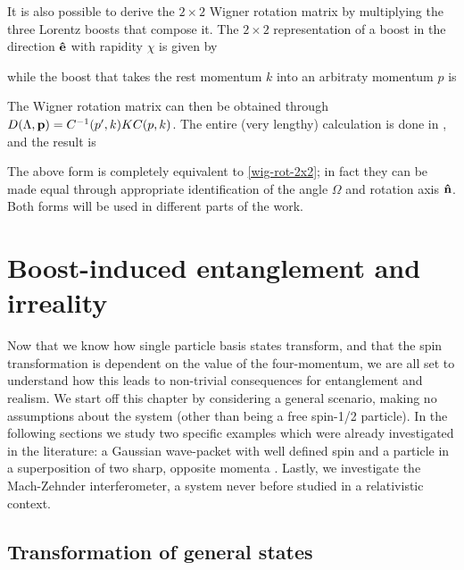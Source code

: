\documentclass[12pt,a4paper,notitlepage]{report}
\begin{document}
It is also possible to derive the $2\times2$ Wigner rotation matrix by multiplying the three Lorentz boosts that compose it. The $2\times2$ representation of a boost in the direction $\vu{e}$ with rapidity $\chi$ is given by

%
while the boost that takes the rest momentum $k$ into an arbitraty momentum $p$ is

%
The Wigner rotation matrix can then be obtained through $D(\Lambda, \vb{p}) = C^{-1}(p',k) K C(p,k)$. The entire (very lengthy) calculation is done in \cite{halpern_1968}, and the result is

%
The above form is completely equivalent to \eqref{wig-rot-2x2}; in fact they can be made equal through appropriate identification of the angle $\Omega$ and rotation axis $\vu{n}$. Both forms will be used in different parts of the work.


\pagebreak

\chapter{Boost-induced entanglement and irreality}

Now that we know how single particle basis states transform, and that the spin transformation is dependent on the value of the four-momentum, we are all set to understand how this leads to non-trivial consequences for entanglement and realism. We start off this chapter by considering a general scenario, making no assumptions about the system (other than being a free spin-1/2 particle). In the following sections we study two specific examples which were already investigated in the literature: a Gaussian wave-packet with well defined spin \cite{peres2002} and a particle in a superposition of two sharp, opposite momenta \cite{dunningham_palge_vedral_2009}. Lastly, we investigate the Mach-Zehnder interferometer, a system never before studied in a relativistic context.

\section{Transformation of general states}
\label{gen-states}
\end{document}
